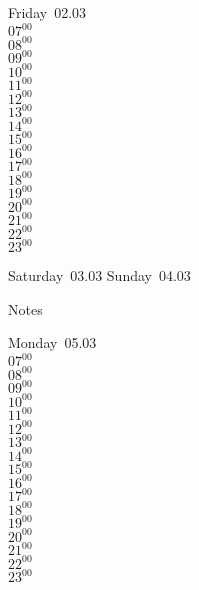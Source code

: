 \documentclass[11pt, a4paper]{book}\usepackage[]{graphicx}\usepackage[]{color}
\begin{document}
\begin{weekdaybox}
  Friday~02.03\\
  { 
  \vfill
  $07^{00}$\\
$08^{00}$\\
$09^{00}$\\
$10^{00}$\\
$11^{00}$\\
$12^{00}$\\
$13^{00}$\\
$14^{00}$\\
$15^{00}$\\
$16^{00}$\\
$17^{00}$\\
$18^{00}$\\
$19^{00}$\\
$20^{00}$\\
$21^{00}$\\
$22^{00}$\\
$23^{00}$\\
  }
\end{weekdaybox}
\begin{weekendbox}
  Saturday~03.03
  \tcblower
  Sunday~04.03
\end{weekendbox} %
\begin{notebox}
  Notes
\end{notebox}
\clearpage
\begin{headerbox}
\end{headerbox}
\begin{weekdaybox}
  Monday~05.03\\
  { 
  \vfill
  $07^{00}$\\
$08^{00}$\\
$09^{00}$\\
$10^{00}$\\
$11^{00}$\\
$12^{00}$\\
$13^{00}$\\
$14^{00}$\\
$15^{00}$\\
$16^{00}$\\
$17^{00}$\\
$18^{00}$\\
$19^{00}$\\
$20^{00}$\\
$21^{00}$\\
$22^{00}$\\
$23^{00}$\\
  }
\end{weekdaybox}
\end{document}
